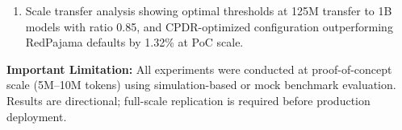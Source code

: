 \begin{enumerate}
\item Scale transfer analysis showing optimal thresholds at 125M transfer to 1B models with ratio 0.85, and CPDR-optimized configuration outperforming RedPajama defaults by 1.32\% at PoC scale.
\end{enumerate}

\textbf{Important Limitation:} All experiments were conducted at proof-of-concept scale (5M--10M tokens) using simulation-based or mock benchmark evaluation. Results are directional; full-scale replication is required before production deployment.
